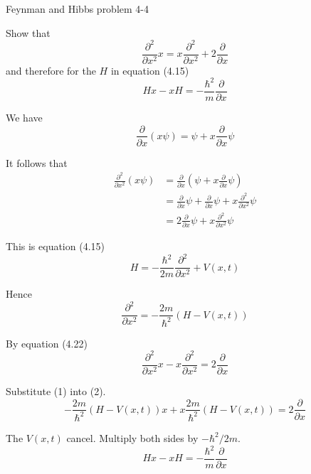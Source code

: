 \documentclass[12pt]{article}
\begin{document}
\begin{center}
Feynman and Hibbs problem 4-4
\end{center}

Show that
\begin{equation*}
\frac{\partial^2}{\partial x^2}x=x\frac{\partial^2}{\partial x^2}+2\frac{\partial}{\partial x}
\tag{4.22}
\end{equation*}
and therefore for the $H$ in equation (4.15)
\begin{equation*}
Hx-xH=-\frac{\hbar^2}{m}\frac{\partial}{\partial x}
\end{equation*}

We have
\begin{equation*}
\frac{\partial}{\partial x}(x\psi)=\psi+x\frac{\partial}{\partial x}\psi
\end{equation*}

It follows that
\begin{align*}
\frac{\partial^2}{\partial x^2}(x\psi)
&=\frac{\partial}{\partial x}\left(\psi+x\frac{\partial}{\partial x}\psi\right)
\\
&=\frac{\partial}{\partial x}\psi+\frac{\partial}{\partial x}\psi+x\frac{\partial^2}{\partial x^2}\psi
\\
&=2\frac{\partial}{\partial x}\psi+x\frac{\partial^2}{\partial x^2}\psi
\end{align*}

This is equation (4.15)
\begin{equation*}
H=-\frac{\hbar^2}{2m}\frac{\partial^2}{\partial x^2}+V(x,t)
\end{equation*}

Hence
\begin{equation*}
\frac{\partial^2}{\partial x^2}=-\frac{2m}{\hbar^2}(H-V(x,t))
\tag{1}
\end{equation*}

By equation (4.22)
\begin{equation*}
\frac{\partial^2}{\partial x^2}x-x\frac{\partial^2}{\partial x^2}=2\frac{\partial}{\partial x}
\tag{2}
\end{equation*}

Substitute (1) into (2).
\begin{equation*}
-\frac{2m}{\hbar^2}(H-V(x,t))x+x\frac{2m}{\hbar^2}(H-V(x,t))=2\frac{\partial}{\partial x}
\end{equation*}

The $V(x,t)$ cancel.
Multiply both sides by $-\hbar^2/2m$.
\begin{equation*}
Hx-xH=-\frac{\hbar^2}{m}\frac{\partial}{\partial x}
\end{equation*}
\end{document}
